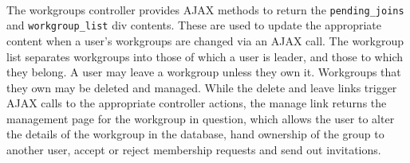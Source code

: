 \paragraph{}
The workgroups controller provides AJAX methods to return the \texttt{pending\_joins} and \texttt{workgroup\_list} div contents. These are used to update the appropriate content when a user's workgroups are changed via an AJAX call. The workgroup list separates workgroups into those of which a user is leader, and those to which they belong. A user may leave a workgroup unless they own it. Workgroups that they own may be deleted and managed. While the delete and leave links trigger AJAX calls to the appropriate controller actions, the manage link returns the management page for the workgroup in question, which allows the user to alter the details of the workgroup in the database, hand ownership of the group to another user, accept or reject membership requests and send out invitations.

